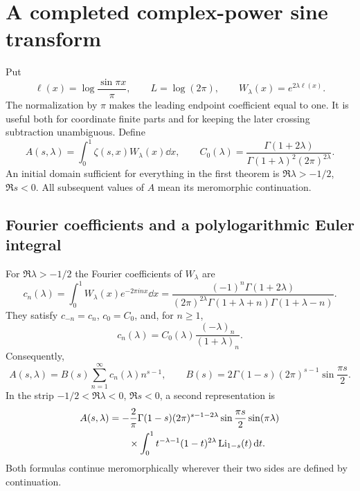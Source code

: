 \section{A completed complex-power sine transform}
\label{sec:beta}

Put
\begin{equation}\label{beta:weight}
 \ell(x)=\log\frac{\sin\pi x}{\pi},\qquad L=\log(2\pi),\qquad
 W_\lambda(x)=e^{2\lambda\ell(x)}.
\end{equation}
The normalization by $\pi$ makes the leading endpoint coefficient equal
to one. It is useful both for coordinate finite parts and for keeping
the later crossing subtraction unambiguous. Define
\begin{equation}\label{beta:A}
 A(s,\lambda)=\int_0^1\zeta(s,x)W_\lambda(x)\dd x,
 \qquad
 C_0(\lambda)=\frac{\Gamma(1+2\lambda)}
 {\Gamma(1+\lambda)^2(2\pi)^{2\lambda}}.
\end{equation}
An initial domain sufficient for everything in the first theorem is
$\Re\lambda>-1/2$, $\Re s<0$. All subsequent values of $A$ mean its
meromorphic continuation.

\subsection{Fourier coefficients and a polylogarithmic Euler integral}

\begin{theorem}\label{beta:transform}
For $\Re\lambda>-1/2$ the Fourier coefficients of $W_\lambda$ are
\begin{equation}\label{beta:cn}
 c_n(\lambda)=\int_0^1W_\lambda(x)e^{-2\pi inx}\dd x
 =\frac{(-1)^n\Gamma(1+2\lambda)}
 {(2\pi)^{2\lambda}\Gamma(1+\lambda+n)\Gamma(1+\lambda-n)}.
\end{equation}
They satisfy $c_{-n}=c_n$, $c_0=C_0$, and, for $n\geq1$,
\begin{equation}\label{beta:pochhammer}
 c_n(\lambda)=C_0(\lambda)\frac{(-\lambda)_n}{(1+\lambda)_n}.
\end{equation}
Consequently,
\begin{equation}\label{beta:dirichlet}
 A(s,\lambda)=B(s)\sum_{n=1}^{\infty}c_n(\lambda)n^{s-1},\qquad
 B(s)=2\Gamma(1-s)(2\pi)^{s-1}\sin\frac{\pi s}{2}.
\end{equation}
In the strip $-1/2<\Re\lambda<0$, $\Re s<0$, a second representation is
\begin{align}\label{beta:euler}
 A(s,\lambda)
 &=-\frac{2}{\pi}\Gamma(1-s)(2\pi)^{s-1-2\lambda}
      \sin\frac{\pi s}{2}\sin(\pi\lambda)\notag\\
 &\hspace{2em}\times
 \int_0^1t^{-\lambda-1}(1-t)^{2\lambda}\operatorname{Li}_{1-s}(t)\,\mathrm d t.
\end{align}
Both formulas continue meromorphically wherever their two sides are
defined by continuation.
\end{theorem}

